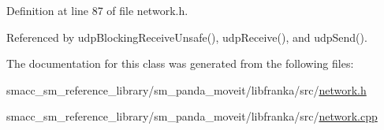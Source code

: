 Definition at line 87 of file network.\+h.



Referenced by udp\+Blocking\+Receive\+Unsafe(), udp\+Receive(), and udp\+Send().



The documentation for this class was generated from the following files\+:\begin{DoxyCompactItemize}
\item 
smacc\+\_\+sm\+\_\+reference\+\_\+library/sm\+\_\+panda\+\_\+moveit/libfranka/src/\hyperlink{network_8h}{network.\+h}\item 
smacc\+\_\+sm\+\_\+reference\+\_\+library/sm\+\_\+panda\+\_\+moveit/libfranka/src/\hyperlink{network_8cpp}{network.\+cpp}\end{DoxyCompactItemize}
